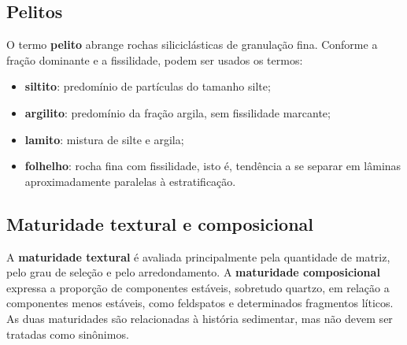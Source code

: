 \subsection{Pelitos}

O termo \textbf{pelito} abrange rochas siliciclásticas de granulação fina. Conforme a
fração dominante e a fissilidade, podem ser usados os termos:

\begin{itemize}
  \item \textbf{siltito}: predomínio de partículas do tamanho silte;
  \item \textbf{argilito}: predomínio da fração argila, sem fissilidade marcante;
  \item \textbf{lamito}: mistura de silte e argila;
  \item \textbf{folhelho}: rocha fina com fissilidade, isto é, tendência a se separar em
        lâminas aproximadamente paralelas à estratificação.
\end{itemize}

\subsection{Maturidade textural e composicional}

A \textbf{maturidade textural} é avaliada principalmente pela quantidade de matriz, pelo
grau de seleção e pelo arredondamento. A \textbf{maturidade composicional} expressa a
proporção de componentes estáveis, sobretudo quartzo, em relação a componentes menos
estáveis, como feldspatos e determinados fragmentos líticos. As duas maturidades são
relacionadas à história sedimentar, mas não devem ser tratadas como sinônimos.

